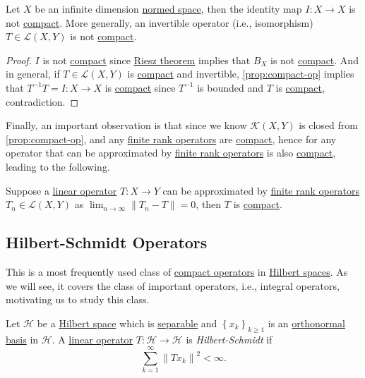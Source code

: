 \begin{corollary}\label{col:iso-are-not-compact}
	Let \(X\) be an infinite dimension \hyperref[def:normed-vector-space]{normed space}, then the identity map \(I\colon X\to X\) is not \hyperref[def:compact-op]{compact}. More generally, an invertible operator (i.e., isomorphism) \(T\in \mathcal{L} (X, Y)\) is not \hyperref[def:compact-op]{compact}.
\end{corollary}
\begin{proof}
	\(I\) is not \hyperref[def:compact-op]{compact} since \hyperref[thm:Riesz]{Riesz theorem} implies that \(B_X\) is not \hyperref[def:compact]{compact}. And in general, if \(T\in \mathcal{L} (X, Y)\) is \hyperref[def:compact-op]{compact} and invertible, \autoref{prop:compact-op} implies that \(T^{-1} T = I\colon X\to X\) is \hyperref[def:compact-op]{compact} since \(T^{-1} \) is bounded and \(T\) is \hyperref[def:compact-op]{compact}, contradiction.
\end{proof}

Finally, an important observation is that since we know \(\mathcal{K}(X, Y)\) is closed from \autoref{prop:compact-op}, and any \hyperref[rmk:finite-rank-op]{finite rank operators} are \hyperref[def:compact-op]{compact}, hence for any operator that can be approximated by \hyperref[rmk:finite-rank-op]{finite rank operators} is also \hyperref[def:compact-op]{compact}, leading to the following.

\begin{corollary}\label{col:almost-finite-rank-op-are-compact}
	Suppose a \hyperref[def:linear-map]{linear operator} \(T\colon X\to Y\) can be approximated by \hyperref[rmk:finite-rank-op]{finite rank operators} \(T_{n} \in \mathcal{L} (X, Y)\) as \(\lim_{n \to \infty} \lVert T_{n} - T \rVert = 0\), then \(T\) is \hyperref[def:compact-op]{compact}.
\end{corollary}

\subsection{Hilbert-Schmidt Operators}
This is a most frequently used class of \hyperref[def:compact-op]{compact operators} in \hyperref[def:Hilbert-space]{Hilbert spaces}. As we will see, it covers the class of important operators, i.e., integral operators, motivating us to study this class.

\begin{definition}\label{def:Hilbert-Schmidt-op}
	Let \(\mathcal{H} \) be a \hyperref[def:Hilbert-space]{Hilbert space} which is \hyperref[def:separable]{separable} and \(\left\{ x_k \right\} _{k\geq 1}\) is an \hyperref[def:orthonormal-basis]{orthonormal basis} in \(\mathcal{H} \). A \hyperref[def:linear-map]{linear operator} \(T\colon \mathcal{H} \to \mathcal{H} \) is \emph{Hilbert-Schmidt} if
	\[
		\sum_{k=1}^{\infty} \left\lVert T x_{k} \right\rVert ^{2} < \infty.
	\]
\end{definition}

